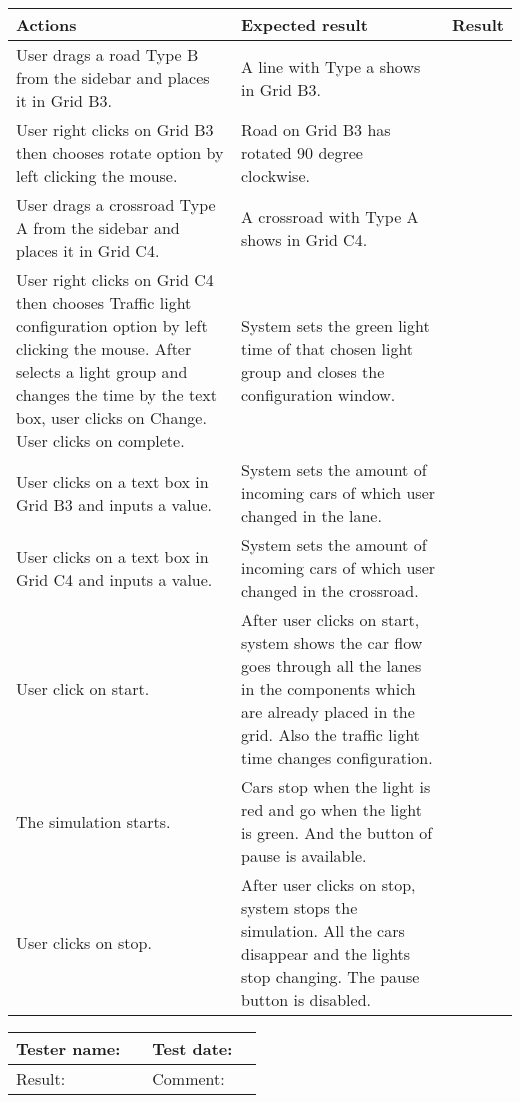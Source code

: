 	\begin{tabularx}{\textwidth}{|X|X|p{2.5cm}|}\hline
	    Actions & Expected result & Result \\\hline
	    User drags a road Type B from the sidebar and places it in Grid B3. & A line with Type a shows in Grid B3. & \pass \\\hline
	    User right clicks on Grid B3 then chooses rotate option by left clicking the mouse. & Road on Grid B3 has rotated 90 degree clockwise. & \pass \\\hline
	    User drags a crossroad Type A from the sidebar and places it in Grid C4. & A crossroad with Type A shows in Grid C4. & \pass \\\hline
	    User right clicks on Grid C4 then chooses Traffic light configuration  option by left clicking the mouse. After selects a light group and changes the time by the text box, user clicks on Change. User clicks on complete. & System sets the green light time of that chosen light group and closes the configuration window.  & \pass \\\hline
	    User clicks on a text box in Grid B3 and inputs a value. & System sets the amount of incoming cars of which user changed in the lane. & \pass \\\hline
	    User clicks on a text box in Grid C4 and inputs a value. & System sets the amount of incoming cars of which user changed in the crossroad. & \pass \\\hline
	    User click on start. & After user clicks on start, system shows the car flow goes through all the lanes in the components which are already placed in the grid. Also the traffic light time changes configuration. & \pass \\\hline
	    The simulation starts. &	Cars stop when the light is red and go when the light is green. And the button of pause is available. & \pass \\\hline	
	    User clicks on stop. & After user clicks on stop, system stops the simulation. All the cars disappear and the lights stop changing. The pause button is disabled. & \pass \\\hline    
	\end{tabularx}

\begin{tabularx}{\textwidth}{|p{3cm}X|p{3cm}X|}\hline
	Tester name: &  & Test date: & \\\hline
	Result: &  \pass & Comment: & \\\hline
\end{tabularx}

